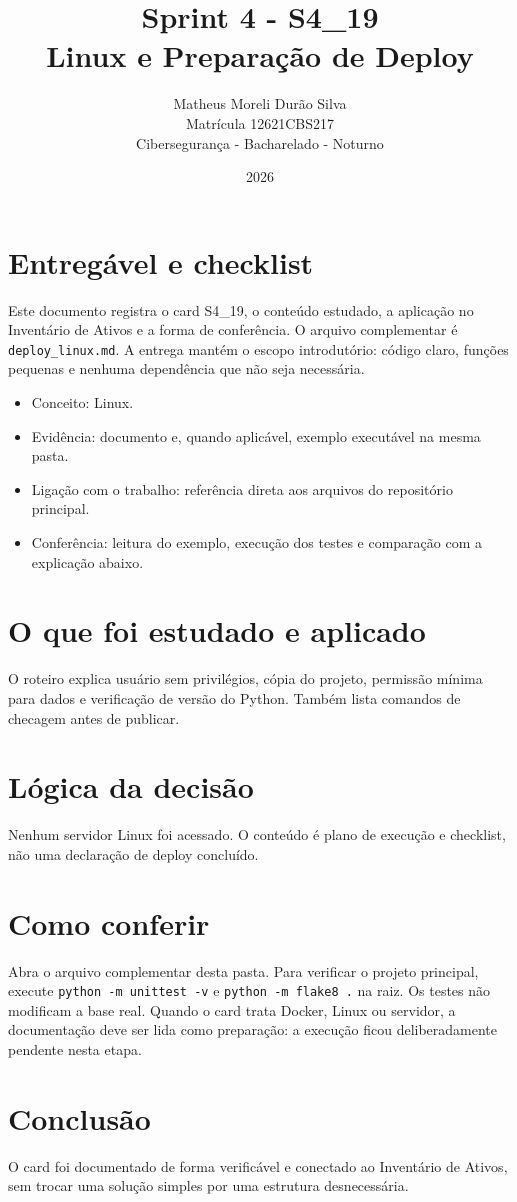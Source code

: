 \documentclass[12pt]{article}
\title{Sprint 4 - S4\_19\\Linux e Preparação de Deploy}
\author{Matheus Moreli Durão Silva\\ Matrícula 12621CBS217\\ Cibersegurança - Bacharelado - Noturno}
\date{2026}
\begin{document}
\maketitle

\section*{Entregável e checklist}
Este documento registra o card S4\_19, o conteúdo estudado, a aplicação no Inventário de Ativos e a forma de conferência. O arquivo complementar é \texttt{deploy\_linux.md}. A entrega mantém o escopo introdutório: código claro, funções pequenas e nenhuma dependência que não seja necessária.

\begin{itemize}
\item Conceito: Linux.
\item Evidência: documento e, quando aplicável, exemplo executável na mesma pasta.
\item Ligação com o trabalho: referência direta aos arquivos do repositório principal.
\item Conferência: leitura do exemplo, execução dos testes e comparação com a explicação abaixo.
\end{itemize}

\section*{O que foi estudado e aplicado}
O roteiro explica usuário sem privilégios, cópia do projeto, permissão mínima para dados e verificação de versão do Python. Também lista comandos de checagem antes de publicar.

\section*{Lógica da decisão}
Nenhum servidor Linux foi acessado. O conteúdo é plano de execução e checklist, não uma declaração de deploy concluído.

\section*{Como conferir}
Abra o arquivo complementar desta pasta. Para verificar o projeto principal, execute \texttt{python -m unittest -v} e \texttt{python -m flake8 .} na raiz. Os testes não modificam a base real. Quando o card trata Docker, Linux ou servidor, a documentação deve ser lida como preparação: a execução ficou deliberadamente pendente nesta etapa.

\section*{Conclusão}
O card foi documentado de forma verificável e conectado ao Inventário de Ativos, sem trocar uma solução simples por uma estrutura desnecessária.
\end{document}
